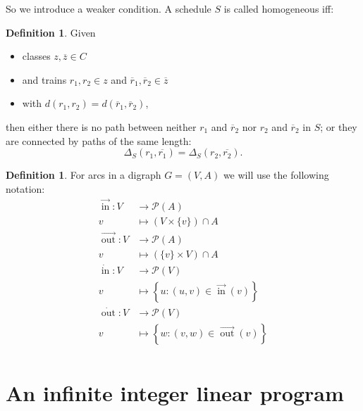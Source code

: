\documentclass[a4paper]{amsart}
\theoremstyle{definition}
\newtheorem{defn}[theorem]{Definition}
\theoremstyle{remark}
\newcommand{\ol}[1]{\overline{#1}}
\DeclareMathOperator{\In}{in}
\DeclareMathOperator{\Out}{out}
\newcommand{\ina}{\ensuremath{\vec{\In}}}
\newcommand{\outa}{\ensuremath{\vec{\Out}}}
\newcommand{\inv}{\ensuremath{\dot{\In}}}
\newcommand{\outv}{\ensuremath{\dot{\Out}}}
\begin{document}
So we introduce a weaker condition.  A schedule \(S\) is called
homogeneous iff:
\begin{defn} Given
  \begin{itemize}
  \item classes \(z, \ol{z} \in C\)
  \item and trains \(r_1, r_2 \in z\) and \(\ol{r}_1,\ol{r}_2 \in \ol{z}\)
  \item with \( d (r_1, r_2) = d(\ol{r}_1, \ol{r}_2) \),
\end{itemize}
  then either there is no path between neither \(r_1\) and
    \(\ol{r}_2\) nor \(r_2\) and \(\ol{r}_2\) in \(S\); or they are connected by paths of the same length:
    \begin{equation}
      \label{homoEq}
      \Delta_S (r_1, \ol{r_1}) = \Delta_S (r_2, \ol{r_2})\textrm{.}
    \end{equation}
\end{defn}

\begin{defn}
For arcs in a digraph \(G=(V,A)\) we will use the following notation:
\begin{align*}
\ina\colon  V &\to \mathcal{P}(A) \\
v &\mapsto \left(V \times \{v\}\right) \cap A\\
\outa\colon  V &\to \mathcal{P}(A) \\
v &\mapsto \left(\{v\} \times V\right) \cap A\\
\inv\colon  V &\to \mathcal{P}(V) \\
v &\mapsto \left\{ u \colon \left(u,v\right) \in \ina(v) \right\}\\
\outv\colon  V &\to \mathcal{P}(V) \\
v &\mapsto \left\{w \colon \left(v,w\right) \in \outa\left(v\right) \right\}\\
\end{align*}
\end{defn}

\section{An infinite integer linear program}
\label{infIP}
\end{document}
